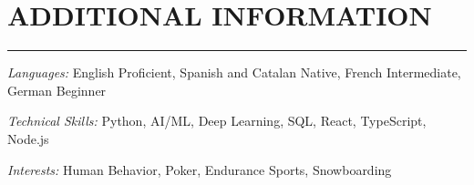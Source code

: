 \documentclass[a4paper,11pt]{article}
\newcommand{\sectionline}{
    \noindent\rule{\textwidth}{0.5pt} %
}
\newcommand{\cvsection}[1]{
    \section{#1} %
    \vspace{-1.0em} %
    \sectionline
}
\begin{document}
\vspace{0.7em} %

\cvsection{ADDITIONAL INFORMATION}
\textit{Languages:} English Proficient, Spanish and Catalan Native, French Intermediate, German Beginner 
\vspace{0.5em} %

\noindent \textit{Technical Skills:} Python, AI/ML, Deep Learning, SQL, React, TypeScript, Node.js\vspace{0.5em} %

\noindent \textit{Interests:} Human Behavior, Poker, Endurance Sports, Snowboarding
\end{document}
